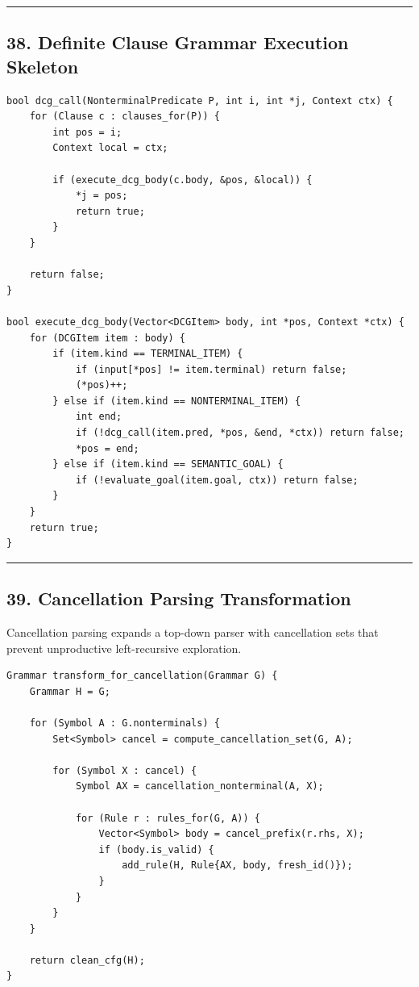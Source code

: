 \documentclass[10pt,letterpaper]{article}
\begin{document}
\medskip\hrule\medskip

\subsection*{38. Definite Clause Grammar Execution Skeleton}

\begin{verbatim}
bool dcg_call(NonterminalPredicate P, int i, int *j, Context ctx) {
    for (Clause c : clauses_for(P)) {
        int pos = i;
        Context local = ctx;

        if (execute_dcg_body(c.body, &pos, &local)) {
            *j = pos;
            return true;
        }
    }

    return false;
}

bool execute_dcg_body(Vector<DCGItem> body, int *pos, Context *ctx) {
    for (DCGItem item : body) {
        if (item.kind == TERMINAL_ITEM) {
            if (input[*pos] != item.terminal) return false;
            (*pos)++;
        } else if (item.kind == NONTERMINAL_ITEM) {
            int end;
            if (!dcg_call(item.pred, *pos, &end, *ctx)) return false;
            *pos = end;
        } else if (item.kind == SEMANTIC_GOAL) {
            if (!evaluate_goal(item.goal, ctx)) return false;
        }
    }
    return true;
}
\end{verbatim}

\medskip\hrule\medskip

\subsection*{39. Cancellation Parsing Transformation}

Cancellation parsing expands a top-down parser with cancellation sets that prevent unproductive left-recursive exploration.

\begin{verbatim}
Grammar transform_for_cancellation(Grammar G) {
    Grammar H = G;

    for (Symbol A : G.nonterminals) {
        Set<Symbol> cancel = compute_cancellation_set(G, A);

        for (Symbol X : cancel) {
            Symbol AX = cancellation_nonterminal(A, X);

            for (Rule r : rules_for(G, A)) {
                Vector<Symbol> body = cancel_prefix(r.rhs, X);
                if (body.is_valid) {
                    add_rule(H, Rule{AX, body, fresh_id()});
                }
            }
        }
    }

    return clean_cfg(H);
}
\end{verbatim}
\end{document}

